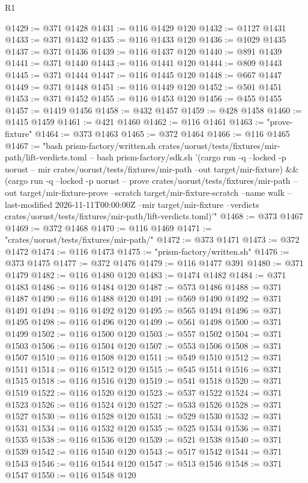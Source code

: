 \begin{lexlean}{R1}
\begin{coremodule}
@1429 := @371 @1428
@1431 := @116 @1429 @120
@1432 := @1127 @1431
@1433 := @371 @1432
@1435 := @116 @1433 @120
@1436 := @1029 @1435
@1437 := @371 @1436
@1439 := @116 @1437 @120
@1440 := @891 @1439
@1441 := @371 @1440
@1443 := @116 @1441 @120
@1444 := @809 @1443
@1445 := @371 @1444
@1447 := @116 @1445 @120
@1448 := @667 @1447
@1449 := @371 @1448
@1451 := @116 @1449 @120
@1452 := @501 @1451
@1453 := @371 @1452
@1455 := @116 @1453 @120
@1456 := @455 @1455
@1457 := @1419 @1456
@1458 := @432 @1457
@1459 := @428 @1458
@1460 := @1415 @1459
@1461 := @421 @1460
@1462 := @116 @1461
@1463 := "prove-fixture"
@1464 := @373 @1463
@1465 := @372 @1464
@1466 := @116 @1465
@1467 := "bash prism-factory/written.sh crates/uorust/tests/fixtures/mir-path/lift-verdicts.toml -- bash prism-factory/sdk.sh '(cargo run -q --locked -p uorust -- mir crates/uorust/tests/fixtures/mir-path --out target/mir-fixture) && (cargo run -q --locked -p uorust -- prove crates/uorust/tests/fixtures/mir-path --out target/mir-fixture-prove --scratch target/mir-fixture-scratch --name walk --last-modified 2026-11-11T00:00:00Z --mir target/mir-fixture --verdicts crates/uorust/tests/fixtures/mir-path/lift-verdicts.toml)'"
@1468 := @373 @1467
@1469 := @372 @1468
@1470 := @116 @1469
@1471 := "crates/uorust/tests/fixtures/mir-path/"
@1472 := @373 @1471
@1473 := @372 @1472
@1474 := @116 @1473
@1475 := "prism-factory/written.sh"
@1476 := @373 @1475
@1477 := @372 @1476
@1479 := @116 @1477 @391
@1480 := @371 @1479
@1482 := @116 @1480 @120
@1483 := @1474 @1482
@1484 := @371 @1483
@1486 := @116 @1484 @120
@1487 := @573 @1486
@1488 := @371 @1487
@1490 := @116 @1488 @120
@1491 := @569 @1490
@1492 := @371 @1491
@1494 := @116 @1492 @120
@1495 := @565 @1494
@1496 := @371 @1495
@1498 := @116 @1496 @120
@1499 := @561 @1498
@1500 := @371 @1499
@1502 := @116 @1500 @120
@1503 := @557 @1502
@1504 := @371 @1503
@1506 := @116 @1504 @120
@1507 := @553 @1506
@1508 := @371 @1507
@1510 := @116 @1508 @120
@1511 := @549 @1510
@1512 := @371 @1511
@1514 := @116 @1512 @120
@1515 := @545 @1514
@1516 := @371 @1515
@1518 := @116 @1516 @120
@1519 := @541 @1518
@1520 := @371 @1519
@1522 := @116 @1520 @120
@1523 := @537 @1522
@1524 := @371 @1523
@1526 := @116 @1524 @120
@1527 := @533 @1526
@1528 := @371 @1527
@1530 := @116 @1528 @120
@1531 := @529 @1530
@1532 := @371 @1531
@1534 := @116 @1532 @120
@1535 := @525 @1534
@1536 := @371 @1535
@1538 := @116 @1536 @120
@1539 := @521 @1538
@1540 := @371 @1539
@1542 := @116 @1540 @120
@1543 := @517 @1542
@1544 := @371 @1543
@1546 := @116 @1544 @120
@1547 := @513 @1546
@1548 := @371 @1547
@1550 := @116 @1548 @120

\end{coremodule}
\end{lexlean}
